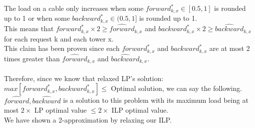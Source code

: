 \documentclass{article}
\begin{document}
\begin{enumerate}
\begin{enumerate}
        The load on a cable only increases when some $forward_{k,x}^* \in [0.5, 1]$ is rounded up to 1 or when some $backward_{k,x}^* \in (0.5, 1]$ is rounded up to 1.\\
        This means that $forward_{k,x}^* \times 2 \geq \hat{forward}_{k,x}$ and $backward_{k,x}^* \times 2 \geq \hat{backward}_{k,x}$ for each request k and each tower x.\\
        This claim has been proven since each $forward_{k,x}^*$ and $backward_{k,x}^*$ are at most 2 times greater than $\hat{forward}_{k,x}$ and $\hat{backward}_{k,x}$.\\
        \\
         Therefore, since we know that relaxed LP's solution: $max[forward_{k,x}^*, backward_{k,x}^* ] \leq $ Optimal solution, we can say the following.\\
         $\hat{forward}, \hat{backward}$ is a solution to this problem with its maximum load being at most $2 \times$ LP optimal value $\leq 2 \times$ ILP optimal value.\\
         We have shown a 2-approximation by relaxing our ILP.
    \end{enumerate}
    

\end{enumerate}
\end{document}
